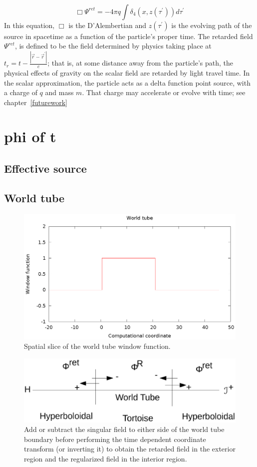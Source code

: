 ~\cite{WardellSelfForceReview}
\begin{equation}
  \Box\Psi^{ret}=-4\pi q\int\delta_4(x,z(\tau^\prime))d\tau^\prime
\end{equation}
In this equation, $\Box$ is the D'Alembertian and $z(\tau^\prime)$ is the evolving path of the source in spacetime as a function of the particle's proper time. The retarded field $\Psi^{ret}$, is defined to be the field determined by physics taking place at $t_r=t-\frac{|\vec{r}-\vec{r}^\prime|}{c}$; that is, at some distance away from the particle's path, the physical effects of gravity on the scalar field are retarded by light travel time. In the scalar approximation, the particle acts as a delta function point source, with a charge of $q$ and mass $m$. That charge may accelerate or evolve with time; see chapter~\ref{futurework}



\section{phi of t}
\subsection{Effective source}
\subsection{World tube}
\begin{figure}
\includegraphics{worldTubeItself}
\caption{Spatial slice of the world tube window function.}
\end{figure}
\begin{figure}
  \includegraphics{WorldTube}
  \caption{Add or subtract the singular field to either side of the world tube boundary before performing the time dependent coordinate transform (or inverting it) to obtain the retarded field in the exterior region and the regularized field in the interior region.}

\end{figure}


